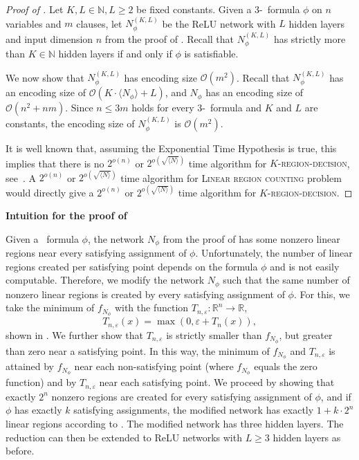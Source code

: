 \documentclass{article}
\begin{document}
\begin{proof}[Proof of ]
Let $K, L\in \mathbb{N}, L\geq 2$ be fixed constants.
Given a 3-\SAT\ formula $\phi$ on $n$ variables and $m$ clauses, let $N^{(K,L)}_\phi$ be the ReLU network with $L$ hidden layers and input dimension $n$ from the proof of
. Recall that $N^{(K,L)}_\phi$ has strictly more than $K\in \mathbb{N}$ hidden layers if and only if $\phi$ is satisfiable.

We now show that $N^{(K,L)}_\phi$ has encoding size $\mathcal{O}(m^2)$. Recall that $N^{(K,L)}_\phi$ has an encoding size of $\mathcal{O}(K\cdot \langle N_\phi\rangle+L)$, and $N_\phi$ has an encoding size of $\mathcal{O}(n^2+nm)$. Since $n\leq 3m$ holds for every 3-\SAT\ formula and $K$ and $L$ are constants, the encoding size of $N^{(K,L)}_\phi$ is $\mathcal{O}(m^2)$.

It is well known that, assuming the Exponential Time Hypothesis is true, this implies that there is no $2^{o(n)}$ or $2^{o(\sqrt{\langle N\rangle})}$ time algorithm for \textsc{$K$-region-decision}, see~\citep{cygan2015lower}.
A $2^{o(n)}$ or $2^{o(\sqrt{\langle N\rangle})}$ time algorithm for \textsc{Linear region counting} problem would directly give a $2^{o(n)}$ or $2^{o(\sqrt{\langle N\rangle})}$ time algorithm for \textsc{$K$-region-decision}.
\end{proof}

\textbf{Intuition for the proof of }

Given a \SAT\ formula $\phi$, the network $N_\phi$ from the proof of  has some nonzero linear regions near every satisfying assignment of $\phi$.
Unfortunately, the number of linear regions created per satisfying point depends on the formula $\phi$ and is not easily computable.
Therefore, we modify the network $N_\phi$ such that the same number of nonzero linear regions is created by every satisfying assignment of $\phi$. For this, we take the minimum of $f_{N_\phi}$ with the function
$T_{n,\varepsilon}:\mathbb{R}^n\to \mathbb{R}$,
\[
T_{n,\varepsilon}(x)= \max(0, \varepsilon+T_n(x)),
\]
shown in . We further show that $T_{n,\varepsilon}$ is strictly smaller than $f_{N_\phi}$, but greater than zero near a satisfying point. In this way, the minimum of $f_{N_\phi}$ and $T_{n,\varepsilon}$ is attained by $f_{N_\phi}$ near each non-satisfying point (where $f_{N_\phi}$ equals the zero function) and by $T_{n,\varepsilon}$ near each satisfying point. We proceed by showing that exactly $2^n$ nonzero regions are created for every satisfying assignment of $\phi$, and if $\phi$ has exactly $k$ satisfying assignments, the modified network has exactly $1+k\cdot 2^n$ linear regions according to .
The modified network has three hidden layers. The reduction can then be extended to ReLU networks with $L\geq 3$ hidden layers as before.
\end{document}
